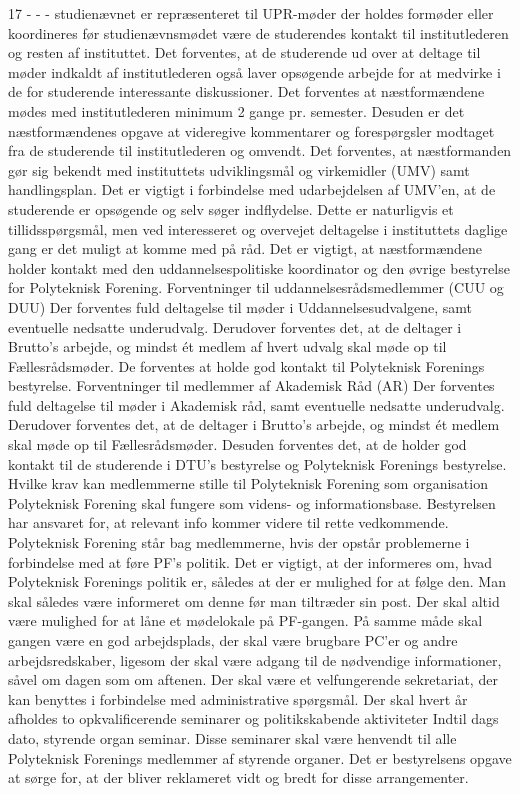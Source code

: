 17
-
-
-
studienævnet er repræsenteret til UPR-møder
der holdes formøder eller koordineres før studienævnsmødet
være de studerendes kontakt til institutlederen og resten af instituttet.
Det forventes, at de studerende ud over at deltage til møder indkaldt af institutlederen også laver opsøgende arbejde for
at medvirke i de for studerende interessante diskussioner. Det forventes at næstformændene mødes med institutlederen
minimum 2 gange pr. semester. Desuden er det næstformændenes opgave at videregive kommentarer og forespørgsler
modtaget fra de studerende til institutlederen og omvendt.
Det forventes, at næstformanden gør sig bekendt med instituttets udviklingsmål og virkemidler (UMV) samt
handlingsplan. Det er vigtigt i forbindelse med udarbejdelsen af UMV’en, at de studerende er opsøgende og selv søger
indflydelse. Dette er naturligvis et tillidsspørgsmål, men ved interesseret og overvejet deltagelse i instituttets daglige
gang er det muligt at komme med på råd.
Det er vigtigt, at næstformændene holder kontakt med den uddannelsespolitiske koordinator og den øvrige bestyrelse
for Polyteknisk Forening.
Forventninger til uddannelsesrådsmedlemmer (CUU og DUU)
Der forventes fuld deltagelse til møder i Uddannelsesudvalgene, samt eventuelle nedsatte underudvalg. Derudover
forventes det, at de deltager i Brutto’s arbejde, og mindst ét medlem af hvert udvalg skal møde op til Fællesrådsmøder.
De forventes at holde god kontakt til Polyteknisk Forenings bestyrelse.
Forventninger til medlemmer af Akademisk Råd (AR)
Der forventes fuld deltagelse til møder i Akademisk råd, samt eventuelle nedsatte underudvalg. Derudover forventes
det, at de deltager i Brutto’s arbejde, og mindst ét medlem skal møde op til Fællesrådsmøder.
Desuden forventes det, at de holder god kontakt til de studerende i DTU’s bestyrelse og Polyteknisk Forenings
bestyrelse.
Hvilke krav kan medlemmerne stille til Polyteknisk Forening som organisation
Polyteknisk Forening skal fungere som videns- og informationsbase. Bestyrelsen har ansvaret for, at relevant info
kommer videre til rette vedkommende.
Polyteknisk Forening står bag medlemmerne, hvis der opstår problemerne i forbindelse med at føre PF’s politik.
Det er vigtigt, at der informeres om, hvad Polyteknisk Forenings politik er, således at der er mulighed for at følge den.
Man skal således være informeret om denne før man tiltræder sin post.
Der skal altid være mulighed for at låne et mødelokale på PF-gangen. På samme måde skal gangen være en god
arbejdsplads, der skal være brugbare PC'er og andre arbejdsredskaber, ligesom der skal være adgang til de nødvendige
informationer, såvel om dagen som om aftenen.
Der skal være et velfungerende sekretariat, der kan benyttes i forbindelse med administrative spørgsmål.
Der skal hvert år afholdes to opkvalificerende seminarer og politikskabende aktiviteter Indtil dags dato, styrende organ
seminar. Disse seminarer skal være henvendt til alle Polyteknisk Forenings medlemmer af styrende organer. Det er
bestyrelsens opgave at sørge for, at der bliver reklameret vidt og bredt for disse arrangementer.

